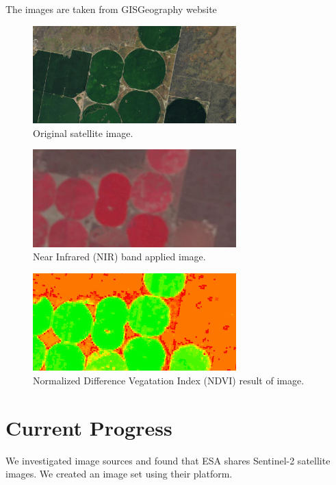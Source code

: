 \documentclass{article} %
\begin{document}
The images are taken from GISGeography website\cite{gisgeography_2018}

\begin{figure}[!htb]
\centering
\includegraphics[width=0.7\textwidth]{ndvi-normal.png}
\caption{Original satellite image.}
\end{figure}

\begin{figure}[!htb]
\centering
\includegraphics[width=0.7\textwidth]{ndvi-nir.png}
\caption{Near Infrared (NIR) band applied image.}
\end{figure}

\begin{figure}[!htb]
\centering
\includegraphics[width=0.7\textwidth]{ndvi-ndvi.png}
\caption{Normalized Difference Vegatation Index (NDVI) result of image.}
\end{figure}

\newpage

\section{Current Progress}	

We investigated image sources and found that ESA shares Sentinel-2 satellite images. We created an image set using their platform.
\end{document}
